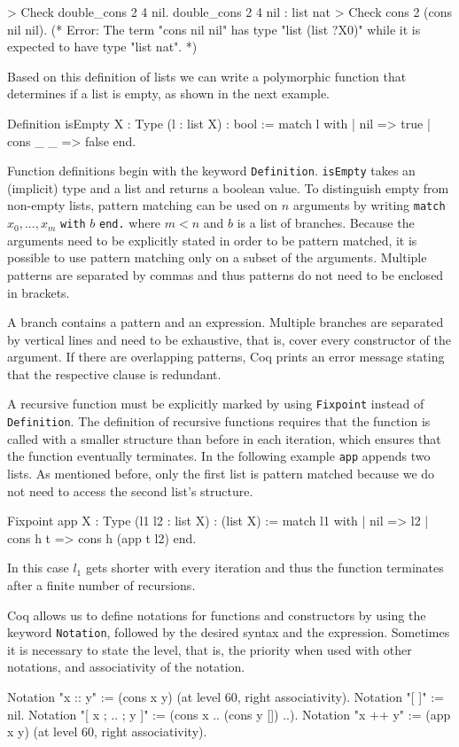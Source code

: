 \documentclass[paper = a4, fleqn, abstract=on, twoside]{scrreprt}
\newcommand{\coqinline}[1]{\texttt{#1}}
\begin{document}
\begin{coqcode}
> Check double_cons 2 4 nil.
double_cons 2 4 nil : list nat
> Check cons 2 (cons nil nil). 
(* Error: The term "cons nil nil" has type "list (list ?X0)"
while it is expected to have type "list nat". *)
\end{coqcode}
Based on this definition of lists we can write a polymorphic function that determines if a list is empty, as shown in the next example.
\begin{coqcode}
Definition isEmpty {X : Type} (l : list X) : bool := 
  match l with
  | nil      => true
  | cons _ _ => false
  end.
\end{coqcode}
Function definitions begin with the keyword \coqinline{Definition}. \coqinline{isEmpty} takes an (implicit) type and a list and returns a boolean value. To distinguish empty from non-empty lists, pattern matching can be used on $n$ arguments by writing \coqinline{match} $x_{0},...,x_{m}$ \coqinline{with} $b$ \coqinline{end.} where $m < n$ and $b$ is a list of branches. Because the arguments need to be explicitly stated in order to be pattern matched, it is possible to use pattern matching only on a subset of the arguments. Multiple patterns are separated by commas and thus patterns do not need to be enclosed in brackets.
\par
A branch contains a pattern and an expression. Multiple branches are separated by vertical lines and need to be exhaustive, that is, cover every constructor of the argument. If there are overlapping patterns, Coq prints an error message stating that the respective clause is redundant.
\par
A recursive function must be explicitly marked by using \coqinline{Fixpoint} instead of \coqinline{Definition}. The definition of recursive functions requires that the function is called with a smaller structure than before in each iteration, which ensures that the function eventually terminates. In the following example \coqinline{app} appends two lists. As mentioned before, only the first list is pattern matched because we do not need to access the second list's structure.
\begin{coqcode}
Fixpoint app {X : Type} (l1 l2 : list X) : (list X) :=
  match l1 with
  | nil => l2
  | cons h t => cons h (app t l2)
  end.
\end{coqcode}
In this case $l_{1}$ gets shorter with every iteration and thus the function terminates after a finite number of recursions. 

Coq allows us to define notations for functions and constructors by using the keyword \coqinline{Notation}, followed by the desired syntax and the expression. Sometimes it is necessary to state the level, that is, the priority when used with other notations, and associativity of the notation.
\begin{coqcode}
Notation "x :: y" := (cons x y) (at level 60, right associativity).
Notation "[ ]" := nil.
Notation "[ x ; .. ; y ]" := (cons x .. (cons y []) ..).
Notation "x ++ y" := (app x y) (at level 60, right associativity).
\end{coqcode}
\end{document}
